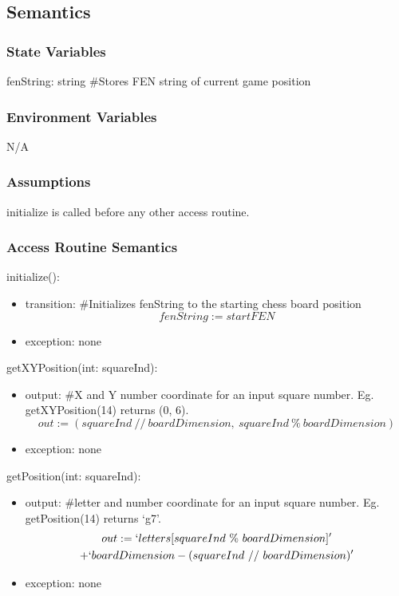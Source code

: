 \documentclass[12pt, titlepage]{article}
\begin{document}
    \subsection{Semantics}
    \subsubsection{State Variables}
    fenString: string \#Stores FEN string of current game position

    \subsubsection{Environment Variables}
    N/A

    \subsubsection{Assumptions}
    initialize is called before any other access routine.

    \subsubsection{Access Routine Semantics}
        \noindent initialize():
        \begin{itemize}
            \item transition: \#Initializes fenString to the starting chess board position \\
                \[fenString := startFEN\]
            \item exception: none
        \end{itemize}

        \noindent getXYPosition(int: squareInd):
        \begin{itemize}
            \item output: \#X and Y number coordinate for an input square number. 
                Eg. getXYPosition(14) returns (0, 6). \\
                \[out := (squareInd\ //\ boardDimension,\ squareInd\ \%\ boardDimension)\]
            \item exception: none
        \end{itemize}

        \noindent getPosition(int: squareInd):
        \begin{itemize}
            \item output: \#letter and number coordinate for an input square number.
                Eg. getPosition(14) returns `g7'. \\
                \begin{multline}
                    out := `letters[squareInd\ \%\ boardDimension]' \notag\\ 
                    + `boardDimension - (squareInd\ //\ boardDimension)'
                \end{multline}
                
            \item exception: none
        \end{itemize}
\end{document}
